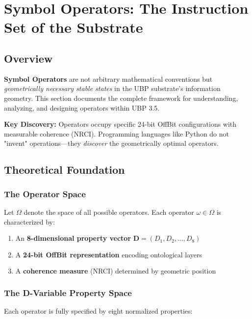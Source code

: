 \section{Symbol Operators: The Instruction Set of the Substrate}
\label{sec:symbol_operators}

\subsection{Overview}

\textbf{Symbol Operators} are not arbitrary mathematical conventions but \emph{geometrically necessary stable states} in the UBP substrate's information geometry. This section documents the complete framework for understanding, analyzing, and designing operators within UBP 3.5.

\textbf{Key Discovery:} Operators occupy specific 24-bit OffBit configurations with measurable coherence (NRCI). Programming languages like Python do not "invent" operations—they \emph{discover} the geometrically optimal operators.

\subsection{Theoretical Foundation}

\subsubsection{The Operator Space}

Let $\Omega$ denote the space of all possible operators. Each operator $\omega \in \Omega$ is characterized by:

\begin{enumerate}
    \item An \textbf{8-dimensional property vector} $\mathbf{D} = (D_1, D_2, \ldots, D_8)$
    \item A \textbf{24-bit OffBit representation} encoding ontological layers
    \item A \textbf{coherence measure} (NRCI) determined by geometric position
\end{enumerate}

\subsubsection{The D-Variable Property Space}

Each operator is fully specified by eight normalized properties:

